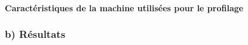 \documentclass[10pt]{report}
\begin{document}
 \paragraph{Caractéristiques de la machine utilisées pour le profilage}

 	
 	
		\subsubsection{b) Résultats}
%
%		
\end{document}
